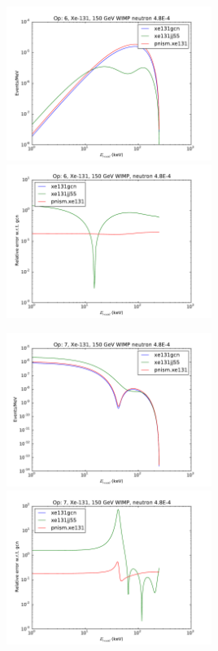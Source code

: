 \documentclass{article}
\begin{document}
\includegraphics[width=0.5\textwidth]{xe131-o6}
\includegraphics[width=0.5\textwidth]{xe131-o6-relerr}

\includegraphics[width=0.5\textwidth]{xe131-o7}
\includegraphics[width=0.5\textwidth]{xe131-o7-relerr}
\end{document}
